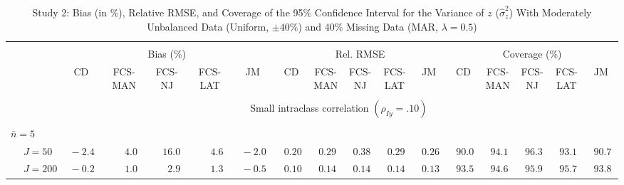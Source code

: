 \begin{sidewaystable}
\begin{threeparttable}
\setlength{\tabcolsep}{1.0pt}
\renewcommand{\arraystretch}{0.95}
\footnotesize
\caption{\small Study 2: Bias (in \%), Relative RMSE, and Coverage of the 95\% Confidence Interval for the Variance of $z$ ($\hat\sigma_z^2$) With Moderately Unbalanced Data (Uniform, $\pm 40\%$) and 40\% Missing Data (MAR, $\lambda=0.5$)}
\begin{tabular}{llccccccccccccccc}
\hline\\[-1.8ex]
& & \multicolumn{5}{c}{Bias (\%)} & \multicolumn{5}{c}{Rel. RMSE} & \multicolumn{5}{c}{Coverage (\%)} \\ \cmidrule(r){3-7}\cmidrule(r){8-12}\cmidrule(r){13-17}
 &  & CD & \makecell{FCS-\\MAN} & \makecell{FCS-\\NJ} & \makecell{FCS-\\LAT} & JM & CD & \makecell{FCS-\\MAN} & \makecell{FCS-\\NJ} & \makecell{FCS-\\LAT} & JM & CD & \makecell{FCS-\\MAN} & \makecell{FCS-\\NJ} & \makecell{FCS-\\LAT} & \multicolumn{1}{c}{JM} \\ 
[0.4ex]\hline\\[-1.8ex]
& & \multicolumn{15}{c}{Small intraclass correlation $(\rho_{Iy}=.10)$} \\[0.6ex]\hline\\[-1.8ex]
\multicolumn{4}{l}{$\bar{n}=5$} \\  & \nopagebreak $\;J=50$  & $\phantom{0}{-}2.4\phantom{0}$ & $\phantom{0}\phantom{-}4.0\phantom{0}$ & $\phantom{-}16.0\phantom{0}$ & $\phantom{0}\phantom{-}4.6\phantom{0}$ & $\phantom{0}{-}2.0\phantom{0}$ & $\phantom{0}0.20\phantom{0}$ & $\phantom{0}0.29\phantom{0}$ & $\phantom{0}0.38\phantom{0}$ & $\phantom{0}0.29\phantom{0}$ & $\phantom{0}0.26\phantom{0}$ & $\phantom{0}90.0\phantom{0}$ & $\phantom{0}94.1\phantom{0}$ & $\phantom{0}96.3\phantom{0}$ & $\phantom{0}93.1\phantom{0}$ & $\phantom{0}90.7\phantom{0}$ \\
 & \nopagebreak $\;J=200$  & $\phantom{0}{-}0.2\phantom{0}$ & $\phantom{0}\phantom{-}1.0\phantom{0}$ & $\phantom{0}\phantom{-}2.9\phantom{0}$ & $\phantom{0}\phantom{-}1.3\phantom{0}$ & $\phantom{0}{-}0.5\phantom{0}$ & $\phantom{0}0.10\phantom{0}$ & $\phantom{0}0.14\phantom{0}$ & $\phantom{0}0.14\phantom{0}$ & $\phantom{0}0.14\phantom{0}$ & $\phantom{0}0.13\phantom{0}$ & $\phantom{0}93.5\phantom{0}$ & $\phantom{0}94.6\phantom{0}$ & $\phantom{0}95.9\phantom{0}$ & $\phantom{0}95.7\phantom{0}$ & $\phantom{0}93.8\phantom{0}$ \\

\end{tabular}
\end{threeparttable}
\end{sidewaystable}
